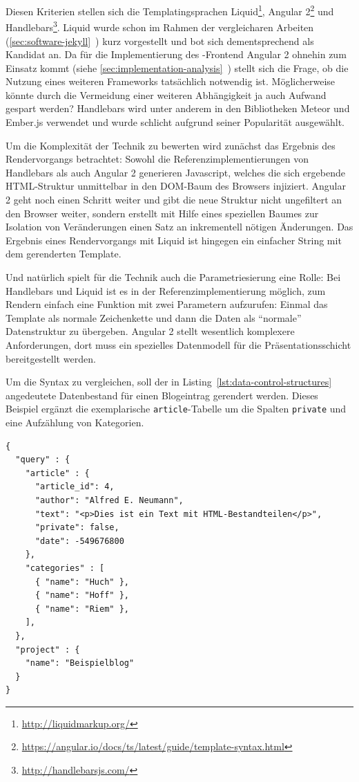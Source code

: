 Diesen Kriterien stellen sich die Templatingsprachen Liquid\footnote{\url{http://liquidmarkup.org/}}, Angular 2\footnote{\url{https://angular.io/docs/ts/latest/guide/template-syntax.html}} und Handlebars\footnote{\url{http://handlebarsjs.com/}}. Liquid wurde schon im Rahmen der vergleicharen Arbeiten (\ref{sec:software-jekyll}~) kurz vorgestellt und bot sich dementsprechend als Kandidat an. Da für die Implementierung des \idename{}-Frontend Angular 2 ohnehin zum Einsatz kommt (siehe \ref{sec:implementation-analysis}~) stellt sich die Frage, ob die Nutzung eines weiteren Frameworks tatsächlich notwendig ist. Möglicherweise könnte durch die Vermeidung einer weiteren Abhängigkeit ja auch Aufwand gespart werden? Handlebars wird unter anderem in den Bibliotheken Meteor und Ember.js verwendet und wurde schlicht aufgrund seiner Popularität ausgewählt.

Um die Komplexität der Technik zu bewerten wird zunächst das Ergebnis des Rendervorgangs betrachtet: Sowohl die Referenzimplementierungen von Handlebars als auch Angular 2 generieren Javascript, welches die sich ergebende HTML-Struktur unmittelbar in den DOM-Baum des Browsers injiziert. Angular 2 geht noch einen Schritt weiter und gibt die neue Struktur nicht ungefiltert an den Browser weiter, sondern erstellt mit Hilfe eines speziellen Baumes zur Isolation von Veränderungen einen Satz an inkrementell nötigen Änderungen. Das Ergebnis eines Rendervorgangs mit Liquid ist hingegen ein einfacher String mit dem gerenderten Template.

Und natürlich spielt für die Technik auch die Parametriesierung eine Rolle: Bei Handlebars und Liquid ist es in der Referenzimplementierung möglich, zum Rendern einfach eine Funktion mit zwei Parametern aufzurufen: Einmal das Template als normale Zeichenkette und dann die Daten als "`normale"' Datenstruktur zu übergeben. Angular 2 stellt wesentlich komplexere Anforderungen, dort muss ein spezielles Datenmodell für die Präsentationsschicht bereitgestellt werden.

Um die Syntax zu vergleichen, soll der in Listing~\ref{lst:data-control-structures} angedeutete Datenbestand für einen Blogeintrag gerendert werden. Dieses Beispiel ergänzt die exemplarische \texttt{article}-Tabelle um die Spalten \texttt{private} und eine Aufzählung von Kategorien.

\begin{lstlisting}[float=h!,caption={JSON-Darstellung eines exemplarischen Datenbestandes}, label={lst:data-control-structures}]
{
  "query" : {
    "article" : {
      "article_id": 4,
      "author": "Alfred E. Neumann",
      "text": "<p>Dies ist ein Text mit HTML-Bestandteilen</p>",
      "private": false,
      "date": -549676800
    },
    "categories" : [
      { "name": "Huch" },
      { "name": "Hoff" },
      { "name": "Riem" },
    ],
  },
  "project" : {
    "name": "Beispielblog"
  }
}
\end{lstlisting}

